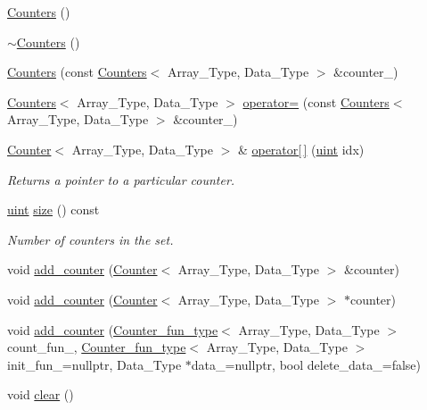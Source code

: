 \begin{DoxyCompactItemize}
\item 
\hyperlink{classbarry_1_1_counters_adebe3273f50b48637efe1b3e73e0dcc6}{Counters} ()
\item 
\hyperlink{classbarry_1_1_counters_acc54ef822eea4170573142ecb189318d}{$\sim$\+Counters} ()
\item 
\hyperlink{classbarry_1_1_counters_a178c0267c1f52a36e10e9d257a21a224}{Counters} (const \hyperlink{classbarry_1_1_counters}{Counters}$<$ Array\+\_\+\+Type, Data\+\_\+\+Type $>$ \&counter\+\_\+)
\item 
\hyperlink{classbarry_1_1_counters}{Counters}$<$ Array\+\_\+\+Type, Data\+\_\+\+Type $>$ \hyperlink{classbarry_1_1_counters_a0edeb22b0b1640f7ada1ef47a30ac486}{operator=} (const \hyperlink{classbarry_1_1_counters}{Counters}$<$ Array\+\_\+\+Type, Data\+\_\+\+Type $>$ \&counter\+\_\+)
\item 
\hyperlink{classbarry_1_1_counter}{Counter}$<$ Array\+\_\+\+Type, Data\+\_\+\+Type $>$ \& \hyperlink{classbarry_1_1_counters_a031002f578171aaa615d08b1a2f9be40}{operator\mbox{[}$\,$\mbox{]}} (\hyperlink{namespacebarry_a11dfc53ddb4672278319aa04f1e09a6c}{uint} idx)
\begin{DoxyCompactList}\small\item\em Returns a pointer to a particular counter. \end{DoxyCompactList}\item 
\hyperlink{namespacebarry_a11dfc53ddb4672278319aa04f1e09a6c}{uint} \hyperlink{classbarry_1_1_counters_aa70f3d91d0f69ff8f4887930efaa0411}{size} () const
\begin{DoxyCompactList}\small\item\em Number of counters in the set. \end{DoxyCompactList}\item 
void \hyperlink{classbarry_1_1_counters_a5b5dafc7a3e0eedae400457f69937613}{add\+\_\+counter} (\hyperlink{classbarry_1_1_counter}{Counter}$<$ Array\+\_\+\+Type, Data\+\_\+\+Type $>$ \&counter)
\item 
void \hyperlink{classbarry_1_1_counters_a74f054aa9ea64103c2d9f79f115777d4}{add\+\_\+counter} (\hyperlink{classbarry_1_1_counter}{Counter}$<$ Array\+\_\+\+Type, Data\+\_\+\+Type $>$ $\ast$counter)
\item 
void \hyperlink{classbarry_1_1_counters_a4ee47504f9c76892c6028619e6b138ee}{add\+\_\+counter} (\hyperlink{namespacebarry_a89b0a03ea2e7f83f2ae89be70a798337}{Counter\+\_\+fun\+\_\+type}$<$ Array\+\_\+\+Type, Data\+\_\+\+Type $>$ count\+\_\+fun\+\_\+, \hyperlink{namespacebarry_a89b0a03ea2e7f83f2ae89be70a798337}{Counter\+\_\+fun\+\_\+type}$<$ Array\+\_\+\+Type, Data\+\_\+\+Type $>$ init\+\_\+fun\+\_\+=nullptr, Data\+\_\+\+Type $\ast$data\+\_\+=nullptr, bool delete\+\_\+data\+\_\+=false)
\item 
void \hyperlink{classbarry_1_1_counters_ae4635c154970a13ce88d2e982fe7dab3}{clear} ()
\end{DoxyCompactItemize}


